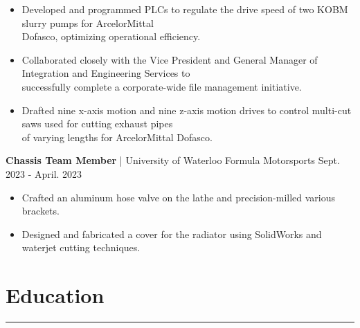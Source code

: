 \documentclass{article}
\begin{document}
\vspace{-0.2cm}
\begin{itemize}[leftmargin=1.5cm]
    \item Developed and programmed PLCs to regulate the drive speed of two KOBM slurry pumps for ArcelorMittal \\ Dofasco, optimizing operational efficiency.

    \vspace{-0.1cm}

    \item Collaborated closely with the Vice President and General Manager of Integration and Engineering Services to \\ successfully complete a corporate-wide file management initiative.

    \vspace{-0.1cm}

    \item Drafted nine x-axis motion and nine z-axis motion drives to control multi-cut saws used for cutting exhaust pipes \\ of varying lengths for ArcelorMittal Dofasco.

\end{itemize}

\textbf{\hspace{-0.10cm} Chassis Team Member} | University of Waterloo Formula Motorsports \hspace{3.3cm} {\small Sept. 2023 - April. 2023}

\vspace{-0.2cm}
\begin{itemize}[leftmargin=1.5cm]
    \item Crafted an aluminum hose valve on the lathe and precision-milled various brackets.


    \vspace{-0.1cm}

    \item Designed and fabricated a cover for the radiator using SolidWorks and waterjet cutting techniques.
\end{itemize}



\vspace{-0.5cm}
\section*{\hspace{0.4cm} \large Education}
\begin{center}
    \vspace{-0.5cm}
    \rule{\textwidth}{0.1pt}
\end{center}
\end{document}
